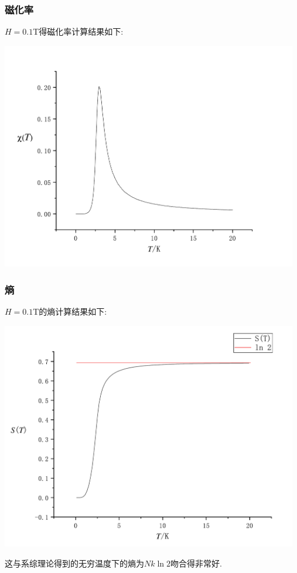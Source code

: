\documentclass[UTF8]{ctexart}
\begin{document}
            \subsubsection{磁化率}
                \indent $H=0.1$T得磁化率计算结果如下:
                \begin{center}
                    \includegraphics[width=13cm]{Chi-T.pdf}
                \end{center}
            \subsubsection{熵}
                \indent $H=0.1$T的熵计算结果如下:   
                \begin{center}
                    \includegraphics[width=13cm]{S-T.pdf}
                \end{center}
                这与系综理论得到的无穷温度下的熵为$Nk\ln 2$吻合得非常好.
                \newpage
\end{document}

